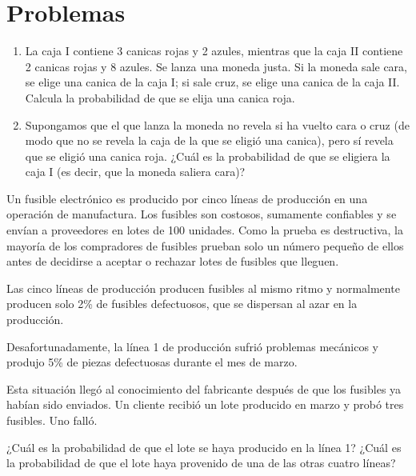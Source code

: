 \section{Problemas}

\begin{problema}
	\begin{enumerate}
		\item 
		La caja I contiene 3 canicas rojas y 2 azules, mientras que la caja II contiene 2 canicas rojas y 8 azules. Se lanza una moneda justa. Si la moneda sale cara, se elige una canica de la caja I; si sale cruz, se elige una canica
		de la caja II. Calcula la probabilidad de que se elija una canica roja.
		\item Supongamos que el que lanza la moneda no revela si ha vuelto cara o cruz (de modo que no se revela la caja de la que se eligió una canica), pero sí revela que se eligió una canica roja. ¿Cuál es la probabilidad de que se eligiera la caja I (es decir, que la moneda saliera cara)?
	\end{enumerate}
\end{problema}

\begin{problema}
	Un fusible electrónico es producido por cinco líneas de producción en una operación de manufactura. Los fusibles son costosos, sumamente confiables y se envían a proveedores en lotes de 100 unidades. Como la prueba es destructiva, la mayoría de los compradores de fusibles prueban solo un número pequeño de ellos antes de decidirse a aceptar o rechazar lotes de fusibles que lleguen.
	
	Las cinco líneas de producción producen fusibles al mismo ritmo y normalmente producen solo 2\% de fusibles defectuosos, que se dispersan al azar en la producción. 
	
	Desafortunadamente, la línea 1 de producción sufrió problemas mecánicos y produjo 5\% de piezas defectuosas durante el mes de marzo. 
	
	Esta situación llegó al conocimiento del fabricante después de que los fusibles ya habían sido enviados. Un cliente recibió un lote producido en marzo y probó tres fusibles. Uno falló. 
	
	¿Cuál es la probabilidad de que el lote se haya producido en la línea 1? ¿Cuál es la
	probabilidad de que el lote haya provenido de una de las otras cuatro líneas?
\end{problema}